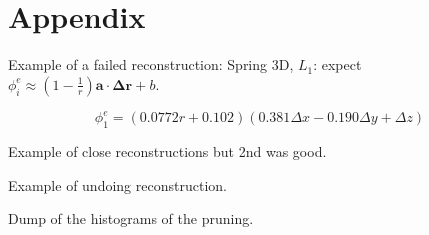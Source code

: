 \documentclass[11pt]{article}
\begin{document}
    
    
    
    
    
    
    
    \section{Appendix}
    Example of a failed reconstruction:
    Spring 3D, $L_1$: expect $\phi^{e}_i \approx (1-\frac{1}{r})\mathbf{a} \cdot \mathbf{\Delta r} + b$.
    
    $$\phi^{e}_1 = (0.0772r + 0.102)(0.381 \Delta x - 0.190 \Delta y + \Delta z)$$

    Example of close reconstructions but 2nd was good.

    Example of undoing reconstruction.

    Dump of the histograms of the pruning.

    

  
\end{document}
